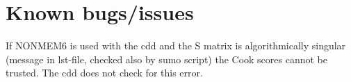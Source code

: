 \documentclass[a4paper,12pt]{article}
\begin{document}
\section{Known bugs/issues}

If NONMEM6 is used with the cdd and the S matrix is algorithmically singular (message in lst-file, checked also by sumo script) the Cook scores cannot  be trusted. The cdd does not check for this error. 
\end{document}
